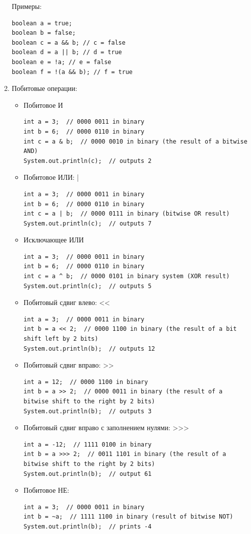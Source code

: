 \begin{enumerate}
Примеры:

 \begin{lstlisting}
boolean a = true;
boolean b = false;
boolean c = a && b; // c = false
boolean d = a || b; // d = true
boolean e = !a; // e = false
boolean f = !(a && b); // f = true
    \end{lstlisting}
    \item Побитовые операции:
    \begin{itemize}
        \item Побитовое И
        \begin{lstlisting}
int a = 3;  // 0000 0011 in binary
int b = 6;  // 0000 0110 in binary
int c = a & b;  // 0000 0010 in binary (the result of a bitwise AND)
System.out.println(c);  // outputs 2
    \end{lstlisting}
        \item Побитовое ИЛИ: |
        \begin{lstlisting}
int a = 3;  // 0000 0011 in binary
int b = 6;  // 0000 0110 in binary
int c = a | b;  // 0000 0111 in binary (bitwise OR result)
System.out.println(c);  // outputs 7
    \end{lstlisting}
        \item Исключающее ИЛИ
        \begin{lstlisting}
int a = 3;  // 0000 0011 in binary
int b = 6;  // 0000 0110 in binary
int c = a ^ b;  // 0000 0101 in binary system (XOR result)
System.out.println(c);  // outputs 5
    \end{lstlisting}
        \item Побитовый сдвиг влево: <<
        \begin{lstlisting}
int a = 3;  // 0000 0011 in binary
int b = a << 2;  // 0000 1100 in binary (the result of a bit shift left by 2 bits)
System.out.println(b);  // outputs 12
    \end{lstlisting}
        \item Побитовый сдвиг вправо: >>
        \begin{lstlisting}
int a = 12;  // 0000 1100 in binary
int b = a >> 2;  // 0000 0011 in binary (the result of a bitwise shift to the right by 2 bits)
System.out.println(b);  // outputs 3
    \end{lstlisting}
        \item Побитовый сдвиг вправо с заполнением нулями: >>>
        \begin{lstlisting}
int a = -12;  // 1111 0100 in binary
int b = a >>> 2;  // 0011 1101 in binary (the result of a bitwise shift to the right by 2 bits)
System.out.println(b);  // output 61
    \end{lstlisting}
        \item Побитовое НЕ: ~
        \begin{lstlisting}
int a = 3;  // 0000 0011 in binary
int b = ~a;  // 1111 1100 in binary (result of bitwise NOT)
System.out.println(b);  // prints -4
    \end{lstlisting}
    \end{itemize}
\end{enumerate}

